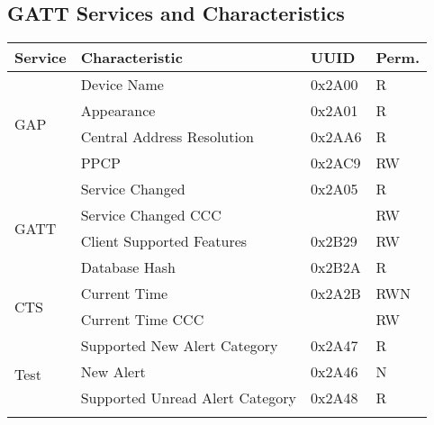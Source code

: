 \subsection{GATT Services and Characteristics}
\label{sec:app_a_services}

\begin{table}[H]
    \centering
    \begin{tabular}{|l|l|l|l|}
    \hline
    \textbf{Service}      & \textbf{Characteristic}                    & \textbf{UUID} & \textbf{Perm.} \\ \hline
    \multirow{4}{*}{GAP}  & Device Name                                & 0x2A00        & R              \\ \cline{2-4} 
                          & Appearance                                 & 0x2A01        & R              \\ \cline{2-4} 
                          & Central Address Resolution                 & 0x2AA6        & R              \\ \cline{2-4} 
                          & PPCP                                       & 0x2AC9        & RW             \\ \hline
    \multirow{4}{*}{GATT} & Service Changed                            & 0x2A05        & R              \\ \cline{2-4} 
                          & Service Changed CCC                        &               & RW             \\ \cline{2-4} 
                          & Client Supported Features                  & 0x2B29        & RW             \\ \cline{2-4} 
                          & Database Hash                              & 0x2B2A        & R              \\ \hline
    \multirow{2}{*}{CTS}  & Current Time                               & 0x2A2B        & RWN            \\ \cline{2-4} 
                          & Current Time CCC                           &               & RW             \\ \hline
    \multirow{5}{*}{Test} & Supported New Alert Category               & 0x2A47        & R              \\ \cline{2-4} 
                          & New Alert                                  & 0x2A46        & N              \\ \cline{2-4} 
                          & Supported Unread Alert Category            & 0x2A48        & R              \\ \cline{2-4} 

\end{tabular}
\end{table}
